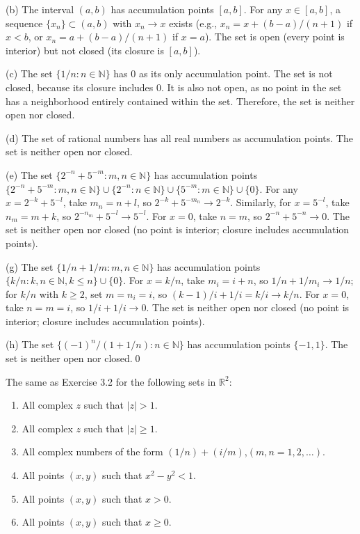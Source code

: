 (b) The interval $(a,b)$ has accumulation points $[a,b]$. For any $x \in [a,b]$, a sequence $\{x_n\} \subset (a,b)$ with $x_n \to x$ exists (e.g., $x_n = x + (b-a)/(n+1)$ if $x < b$, or $x_n = a + (b-a)/(n+1)$ if $x = a$). The set is open (every point is interior) but not closed (its closure is $[a,b]$).

(c) The set $\{1/n : n \in \mathbb{N}\}$ has 0 as its only accumulation point. The set is not closed, because its closure includes 0. It is also not open, as no point in the set has a neighborhood entirely contained within the set. Therefore, the set is neither open nor closed.


(d) The set of rational numbers has all real numbers as accumulation points. The set is neither open nor closed.

(e) The set $\{2^{-n} + 5^{-m} : m,n \in \mathbb{N}\}$ has accumulation points $\{2^{-n} + 5^{-m} : m,n \in \mathbb{N}\} \cup \{2^{-n} : n \in \mathbb{N}\} \cup \{5^{-m} : m \in \mathbb{N}\} \cup \{0\}$. For any $x = 2^{-k} + 5^{-l}$, take $m_n = n + l$, so $2^{-k} + 5^{-m_n} \to 2^{-k}$. Similarly, for $x = 5^{-l}$, take $n_m = m + k$, so $2^{-n_m} + 5^{-l} \to 5^{-l}$. For $x = 0$, take $n = m$, so $2^{-n} + 5^{-n} \to 0$. The set is neither open nor closed (no point is interior; closure includes accumulation points).

(g) The set $\{1/n + 1/m : m,n \in \mathbb{N}\}$ has accumulation points $\{k/n : k,n \in \mathbb{N}, k \leq n\} \cup \{0\}$. For $x = k/n$, take $m_i = i + n$, so $1/n + 1/m_i \to 1/n$; for $k/n$ with $k \geq 2$, set $m = n_i = i$, so $(k-1)/i + 1/i = k/i \to k/n$. For $x = 0$, take $n = m = i$, so $1/i + 1/i \to 0$. The set is neither open nor closed (no point is interior; closure includes accumulation points).

(h) The set $\{(-1)^n/(1+1/n) : n \in \mathbb{N}\}$ has accumulation points $\{-1, 1\}$. The set is neither open nor closed.\qed


\begin{problembox}
The same as Exercise 3.2 for the following sets in $\mathbb{R}^2$:
\begin{enumerate}[label=\textbf{(\alph*)}]
\item All complex $z$ such that $|z| > 1$.
\item All complex $z$ such that $|z| \ge 1$.
\item All complex numbers of the form $(1/n) + (i/m)$,\quad $(m, n = 1, 2, \dots)$.
\item All points $(x, y)$ such that $x^2 - y^2 < 1$.
\item All points $(x, y)$ such that $x > 0$.
\item All points $(x, y)$ such that $x \ge 0$.
\end{enumerate}
\end{problembox}

